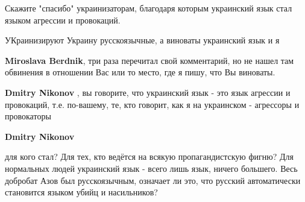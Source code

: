 \begin{itemize}
Скажите "спасибо" украинизаторам, благодаря которым украинский язык стал языком
агрессии и провокаций.

\begin{itemize}
 
УКраинизируют Украину русскоязычные, а виноваты украинский язык и я

 
\textbf{Miroslava Berdnik}, три раза перечитал свой комментарий, но не нашел там обвинения в отношении Вас или то место, где я пишу, что Вы виноваты.


 
\textbf{Dmitry Nikonov} , вы говорите, что украинский язык - это язык агрессии и провокаций, т.е. по-вашему, те, кто говорит, как я на украинском - агрессоры и провокаторы

 
\textbf{Dmitry Nikonov} 

для кого стал? Для тех, кто ведётся на всякую пропагандистскую фигню? Для
нормальных людей украинский язык - всего лишь язык, ничего большего. Весь
добробат Азов был русскоязычным, означает ли это, что русский автоматически
становится языком убийц и насильников?


 

\end{itemize}
\end{itemize}
